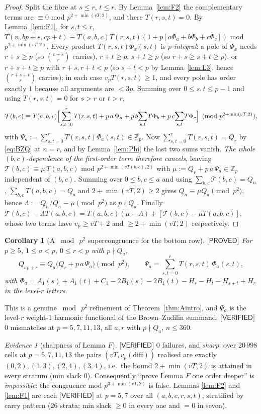 \documentclass[11pt,reqno]{amsart}
\theoremstyle{plain}
\newtheorem{corollary}[theorem]{Corollary}
\theoremstyle{definition}
\theoremstyle{remark}
\newtheorem{evidence}[theorem]{Evidence}
\numberwithin{equation}{section}
\newcommand{\ZZ}{\mathbb{Z}}
\newcommand{\Zp}{\ZZ_p}
\newcommand{\Tcal}{\mathcal{T}}
\newcommand{\PROVED}{\textsf{[PROVED]}}
\newcommand{\VERIFIED}{\textsf{[VERIFIED]}}
\begin{document}
\begin{proof}
Split the fibre at $s\le r$, $t\le r$. By Lemma~\ref{lem:F2} the complementary terms are
$\equiv0$ mod $p^{2+\min(vT,2)}$, and there $T(r,s,t)=0$. By Lemma~\ref{lem:F1}, for
$s,t\le r$,
$T(n,bp+s,cp+t)\equiv T(a,b,c)T(r,s,t)(1+p[a\Phi_a+b\Phi_b+c\Phi_c])$ mod $p^{2+\min(vT,2)}$.
Every product $T(r,s,t)\Phi_x(s,t)$ is $p$-\emph{integral}: a pole of $\Phi_x$ needs $r+s\ge p$
(so $\binom{r+s}{r}$ carries), $r+t\ge p$, $s+t\ge p$ (so $r+s\ge s+t\ge p$), or $r+s+t\ge p$
with $r+s,r+t<p$ (so $s+t<p$ by Lemma~\ref{lem:L3}, hence $\binom{r+s+t}{r}$ carries); in each
case $v_pT(r,s,t)\ge1$, and every pole has order exactly $1$ because all arguments are $<3p$.
Summing over $0\le s,t\le p-1$ and using $T(r,s,t)=0$ for $s>r$ or $t>r$,
\[
\Tcal(b,c)\equiv T(a,b,c)\Bigl[\sum_{s,t=0}^{r}T(r,s,t)+p\,a\,\Psi_a
+p\,b\!\sum_{s,t}\!T\Phi_b+p\,c\!\sum_{s,t}\!T\Phi_c\Bigr]\pmod{p^{2+\min(vT,2)}},
\]
with $\Psi_a:=\sum_{s,t=0}^{r}T(r,s,t)\Phi_a(s,t)\in\Zp$. Now
$\sum_{s,t=0}^{r}T(r,s,t)=Q_r$ by \eqref{eq:BZQ} at $n=r$, and by Lemma~\ref{lem:Phi} the last
two sums vanish. \emph{The whole $(b,c)$-dependence of the first-order term therefore cancels},
leaving $\Tcal(b,c)\equiv\mu\,T(a,b,c)$ mod $p^{2+\min(vT(b,c),2)}$ with
$\mu:=Q_r+p\,a\,\Psi_a\in\Zp$ independent of $(b,c)$. Summing over $0\le b,c\le a$ and using
$\sum_{b,c}\Tcal(b,c)=Q_n$, $\sum_{b,c}T(a,b,c)=Q_a$ and $2+\min(vT,2)\ge2$ gives
$Q_n\equiv\mu Q_a\pmod{p^2}$, hence $\Lambda:=Q_n/Q_a\equiv\mu\pmod{p^2}$ as $p\nmid Q_a$.
Finally $\Tcal(b,c)-\Lambda T(a,b,c)=T(a,b,c)(\mu-\Lambda)+[\Tcal(b,c)-\mu T(a,b,c)]$, whose
two terms have $v_p\ge vT+2$ and $\ge2+\min(vT,2)$ respectively.
\end{proof}

\begin{corollary}[A $\bmod\ p^2$ supercongruence for the bottom row]\label{cor:Qsuper}
$\PROVED$ For $p\ge5$, $1\le a<p$, $0\le r<p$ with $p\nmid Q_a$,
\[
Q_{ap+r}\equiv Q_a\bigl(Q_r+p\,a\,\Psi_a\bigr)\pmod{p^2},\qquad
\Psi_a=\sum_{s,t=0}^{r}T(r,s,t)\,\Phi_a(s,t),
\]
with $\Phi_a=A_1(s)+A_1(t)+C_1-2B_1(s)-2B_1(t)-H_s-H_t+H_{s+t}+H_r$ in the level-$r$ letters.
\end{corollary}

This is a genuine $\bmod\ p^2$ refinement of Theorem~\ref{thm:Aintro}, and $\Psi_a$ is the
level-$r$ weight-$1$ harmonic functional of the Brown--Zudilin summand. $\VERIFIED$ $0$
mismatches at $p=5,7,11,13$, all $a,r$ with $p\nmid Q_a$, $n\le360$.

\begin{evidence}[sharpness of Lemma $F$]\label{ev:F}
$\VERIFIED$ $0$ failures, and \emph{sharp}: over $20\,998$ cells at $p=5,7,11,13$ the pairs
$(vT,v_p(\mathrm{diff}))$ realised are exactly $(0,2),(1,3),(2,4),(3,4)$, i.e.\ the bound
$2+\min(vT,2)$ is attained in every stratum (min slack $0$). Consequently ``prove Lemma $F$ one
order deeper'' is \emph{impossible}: the congruence mod $p^{3+\min(vT,2)}$ is false. Lemmas
\ref{lem:F2} and \ref{lem:F1} are each $\VERIFIED$ at $p=5,7$ over all $(a,b,c,r,s,t)$,
stratified by carry pattern ($26$ strata; min slack $\ge0$ in every one and $=0$ in seven).
\end{evidence}
\end{document}
